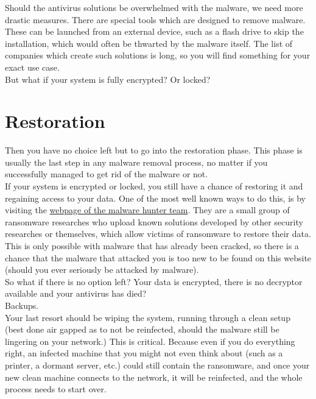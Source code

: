 Should the antivirus solutions be overwhelmed with the malware, we need more drastic measures.
There are special tools which are designed to remove malware.
These can be launched from an external device, such as a flash drive to skip the installation, which would often be thwarted by the malware itself.
The list of companies which create such solutions is long, so you will find something for your exact use case.
\\

But what if your system is fully encrypted?
Or locked?

\section{Restoration}

Then you have no choice left but to go into the restoration phase.
This phase is usually the last step in any malware removal process, no matter if you successfully managed to get rid of the malware or not.
\\

If your system is encrypted or locked, you still have a chance of restoring it and regaining access to your data.
One of the most well known ways to do this, is by visiting the \href{https://id-ransomware.malwarehunterteam.com}{webpage of the malware hunter team}.
They are a small group of ransomware researches who upload known solutions developed by other security researches or themselves, which allow victims of ransomware to restore their data.
This is only possible with malware that has already been cracked, so there is a chance that the malware that attacked you is too new to be found on this website (should you ever seriously be attacked by malware).
\\

So what if there is no option left?
Your data is encrypted, there is no decryptor available and your antivirus has died?
\\

Backups.
\\

Your last resort should be wiping the system, running through a clean setup (best done air gapped as to not be reinfected, should the malware still be lingering on your network.)
This is critical.
Because even if you do everything right, an infected machine that you might not even think about (such as a printer, a dormant server, etc.) could still contain the ransomware, and once your new clean machine connects to the network, it will be reinfected, and the whole process needs to start over.
\\

